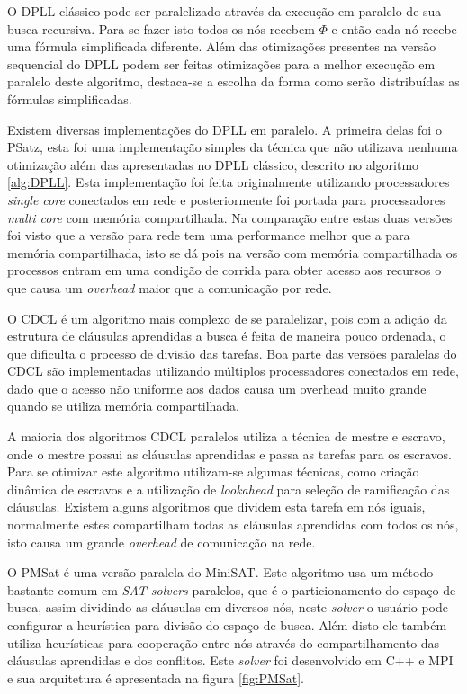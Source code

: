 \documentclass{ufsc-thesis}
\begin{document}
O DPLL clássico pode ser paralelizado através da execução em paralelo de sua busca recursiva. 
Para se fazer isto todos os nós recebem $\Phi$ e então cada nó recebe uma fórmula simplificada 
diferente. Além das otimizações presentes na versão sequencial do DPLL podem ser feitas 
otimizações para a melhor execução em paralelo deste algoritmo, destaca-se a escolha 
da forma como serão distribuídas as fórmulas simplificadas.

Existem diversas implementações do DPLL em paralelo. A primeira delas foi o PSatz\cite{Jurkowiak2005}, esta 
foi uma implementação simples da técnica que não utilizava nenhuma otimização além 
das apresentadas no DPLL clássico, descrito no algoritmo \ref{alg:DPLL}. Esta implementação 
foi feita originalmente utilizando processadores \textit{single core} conectados em rede 
e posteriormente foi portada para processadores \textit{multi core} com memória compartilhada\cite{holldobler2011short}.
Na comparação entre estas duas versões foi visto que a versão para rede tem uma performance 
melhor que a para memória compartilhada, isto se dá pois na versão 
com memória compartilhada os processos entram em uma condição de corrida para obter acesso 
aos recursos o que causa um \textit{overhead} maior que a comunicação por rede.


O CDCL é um algoritmo mais complexo de se paralelizar, pois com a adição da estrutura de 
cláusulas aprendidas a busca é feita de maneira pouco ordenada, o que dificulta o processo 
de divisão das tarefas. Boa parte das versões paralelas do CDCL são implementadas 
utilizando múltiplos processadores conectados em rede, dado que o acesso não uniforme 
aos dados causa um overhead muito grande quando se utiliza memória compartilhada. 

A maioria dos algoritmos CDCL paralelos utiliza a técnica de mestre e escravo, onde 
o mestre possui as cláusulas aprendidas e passa as tarefas para os escravos. Para se 
otimizar este algoritmo utilizam-se algumas técnicas, como criação dinâmica de escravos e 
a utilização de \textit{lookahead} para seleção de ramificação das cláusulas. Existem 
alguns algoritmos que dividem esta tarefa em nós iguais, normalmente estes compartilham 
todas as cláusulas aprendidas com todos os nós, isto causa um grande 
\textit{overhead} de comunicação na rede.

O PMSat\cite{Gil_pmsat} é uma versão paralela do MiniSAT\cite{Sorensson02minisat}. 
Este algoritmo usa um método bastante comum 
em \textit{SAT solvers} paralelos, que é o particionamento do espaço de busca, assim 
dividindo as cláusulas em diversos nós, neste \textit{solver} o usuário pode configurar 
a heurística para divisão do espaço de busca. Além disto ele também utiliza heurísticas para 
cooperação entre nós através do compartilhamento das cláusulas aprendidas e dos conflitos.
Este \textit{solver} foi desenvolvido em C++ e MPI e sua arquitetura é apresentada na figura \ref{fig:PMSat}.
\end{document}
